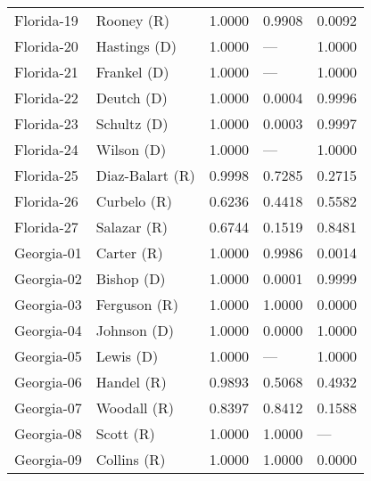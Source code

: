 \begin{longtable}{llrll}
        Florida-19 &           {\color{Red} Rooney (R)} &       1.0000 &        0.9908 &        0.0092 \\
        Florida-20 &        {\color{Blue} Hastings (D)} &       1.0000 &           --- &        1.0000 \\
        Florida-21 &         {\color{Blue} Frankel (D)} &       1.0000 &           --- &        1.0000 \\
        Florida-22 &          {\color{Blue} Deutch (D)} &       1.0000 &        0.0004 &        0.9996 \\
        Florida-23 &         {\color{Blue} Schultz (D)} &       1.0000 &        0.0003 &        0.9997 \\
        Florida-24 &          {\color{Blue} Wilson (D)} &       1.0000 &           --- &        1.0000 \\
        Florida-25 &      {\color{Red} Diaz-Balart (R)} &       0.9998 &        0.7285 &        0.2715 \\
        Florida-26 &          {\color{Red} Curbelo (R)} &       0.6236 &        0.4418 &        0.5582 \\
        Florida-27 &          {\color{Red} Salazar (R)} &       0.6744 &        0.1519 &        0.8481 \\
        Georgia-01 &           {\color{Red} Carter (R)} &       1.0000 &        0.9986 &        0.0014 \\
        Georgia-02 &          {\color{Blue} Bishop (D)} &       1.0000 &        0.0001 &        0.9999 \\
        Georgia-03 &         {\color{Red} Ferguson (R)} &       1.0000 &        1.0000 &        0.0000 \\
        Georgia-04 &         {\color{Blue} Johnson (D)} &       1.0000 &        0.0000 &        1.0000 \\
        Georgia-05 &           {\color{Blue} Lewis (D)} &       1.0000 &           --- &        1.0000 \\
        Georgia-06 &           {\color{Red} Handel (R)} &       0.9893 &        0.5068 &        0.4932 \\
        Georgia-07 &          {\color{Red} Woodall (R)} &       0.8397 &        0.8412 &        0.1588 \\
        Georgia-08 &            {\color{Red} Scott (R)} &       1.0000 &        1.0000 &           --- \\
        Georgia-09 &          {\color{Red} Collins (R)} &       1.0000 &        1.0000 &        0.0000 \\

\end{longtable}
